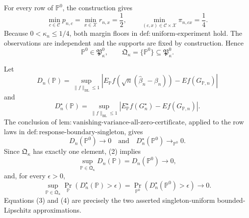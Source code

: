 For every row of \(\mathbb P^0\), the construction gives
\[
\min_{c\in\mathcal C}p_{n,c}=\min_{x\in\mathcal X}r_{n,x}=\frac12,
\qquad
\min_{(c,x)\in\mathcal C\times\mathcal X}\pi_{n,cx}=\frac14.
\]
Because \(0<\kappa_n\leq1/4\), both margin floors in \(\mathrm{def:uniform\text{-}experiment}\) hold.  The observations are independent and the supports are fixed by construction.  Hence
\[
\mathbb P^0\in\mathfrak P_{\kappa}^{0},
\qquad
\mathfrak Q_{\kappa}=\lbrace\mathbb P^0\rbrace
\subseteq\mathfrak P_{\kappa}^{0}.
\tag{1}
\]

Let
\[
D_n(\mathbb P)=
\sup_{\lVert f\rVert_{\mathrm{BL}}\leq1}
\left|
E_{\mathbb P}f\!\left(\sqrt n(\widehat\beta_n-\beta_n)\right)
-E f(G_{\mathbb P,n})
\right|
\]
and
\[
D_n^\star(\mathbb P)=
\sup_{\lVert f\rVert_{\mathrm{BL}}\leq1}
\left|
E_{\mathbb P}^{\star}f(G_n^\star)-E f(G_{\mathbb P,n})
\right|.
\]
The conclusion of \(\mathrm{lem:vanishing\text{-}variance\text{-}all\text{-}zero\text{-}certificate}\), applied to the row laws in \(\mathrm{def:response\text{-}boundary\text{-}singleton}\), gives
\[
D_n(\mathbb P^0)\longrightarrow0
\quad\text{and}\quad
D_n^\star(\mathbb P^0)\longrightarrow_{\mathbb P^0}0.
\tag{2}
\]
Since \(\mathfrak Q_{\kappa}\) has exactly one element, (2) implies
\[
\sup_{\mathbb P\in\mathfrak Q_{\kappa}}D_n(\mathbb P)
=D_n(\mathbb P^0)\longrightarrow0,
\tag{3}
\]
and, for every \(\epsilon>0\),
\[
\sup_{\mathbb P\in\mathfrak Q_{\kappa}}
\Pr_{\mathbb P}\!\left(D_n^\star(\mathbb P)>\epsilon\right)
=
\Pr_{\mathbb P^0}\!\left(D_n^\star(\mathbb P^0)>\epsilon\right)
\longrightarrow0.
\tag{4}
\]
Equations (3) and (4) are precisely the two asserted singleton-uniform bounded-Lipschitz approximations.

